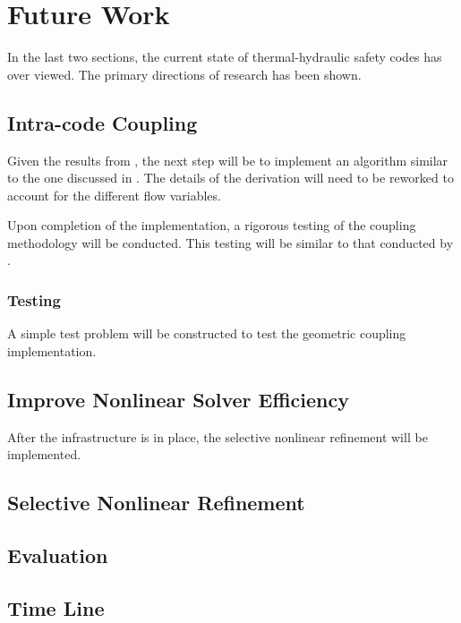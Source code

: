 \chapter{Future Work}
\label{chap:future}
In the last two sections, the current state of thermal-hydraulic safety codes has over viewed.
The primary directions of research has been shown.

\section{Intra-code Coupling}
\label{sect:future_intracode_coupling}

Given the results from , the next step will be to implement an algorithm similar to the one discussed in .
The details of the derivation will need to be reworked to account for the different flow variables.

Upon completion of the implementation, a rigorous testing of the coupling methodology will be conducted.
This testing will be similar to that conducted by \citet{Weaver2002}.

\subsection{Testing}
A simple test problem will be constructed to test the geometric coupling implementation.


\section{Improve Nonlinear Solver Efficiency}
\label{sect:future_nonlinear_solver}
After the infrastructure is in place, the selective nonlinear refinement will be implemented.

\section{Selective Nonlinear Refinement}
\label{sect:selective_nonlinear_refinement}


\section{Evaluation}
\label{sect:future_eval}


\section{Time Line}
\label{sect:time_line}





